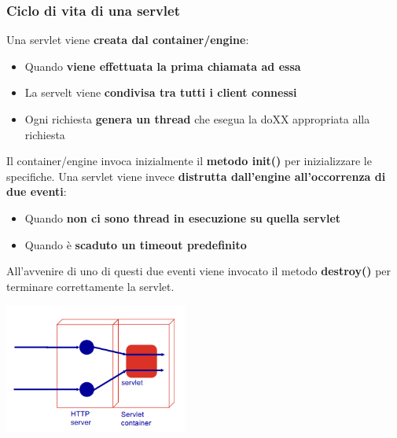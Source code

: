 \documentclass[12pt]{article}
\begin{document}
\subsubsection{Ciclo di vita di una servlet}
Una servlet viene \textbf{creata dal container/engine}:
\begin{itemize}
    \item Quando \textbf{viene effettuata la prima chiamata ad essa}
    \item La servelt viene \textbf{condivisa tra tutti i client connessi}
    \item Ogni richiesta \textbf{genera un thread} che esegua la doXX appropriata alla richiesta
\end{itemize}
Il container/engine invoca inizialmente il \textbf{metodo init()} per inizializzare le specifiche.
Una servlet viene invece \textbf{distrutta dall'engine all'occorrenza di due eventi}:
\begin{itemize}
    \item Quando \textbf{non ci sono thread in esecuzione su quella servlet}
    \item Quando è \textbf{scaduto un timeout predefinito}
\end{itemize}
All'avvenire di uno di questi due eventi viene invocato il metodo \textbf{destroy()} per terminare correttamente la servlet.
\begin{center}
    \includegraphics[width = 0.45\textwidth]{Images/186.png}
\end{center}
\end{document}
